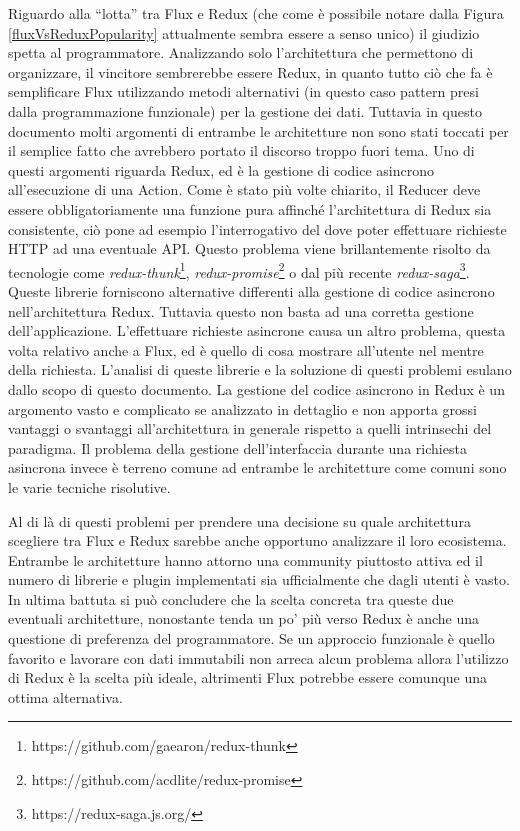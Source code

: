 Riguardo alla “lotta” tra Flux e Redux (che come è possibile notare dalla Figura \ref{fluxVsReduxPopularity} attualmente sembra essere a senso unico) il giudizio spetta al programmatore. Analizzando solo l'architettura che permettono di organizzare, il vincitore sembrerebbe essere Redux, in quanto tutto ciò che fa è semplificare Flux utilizzando metodi alternativi (in questo caso pattern presi dalla programmazione funzionale) per la gestione dei dati. Tuttavia in questo documento molti argomenti di entrambe le architetture non sono stati toccati per il semplice fatto che avrebbero portato il discorso troppo fuori tema.
Uno di questi argomenti riguarda Redux, ed è la gestione di codice asincrono all'esecuzione di una Action. Come è stato più volte chiarito, il Reducer deve essere obbligatoriamente una funzione pura affinché l'architettura di Redux sia consistente, ciò pone ad esempio l'interrogativo del dove poter effettuare richieste HTTP ad una eventuale API. Questo problema viene brillantemente risolto da tecnologie come \textit{redux-thunk}\footnote{https://github.com/gaearon/redux-thunk}, \textit{redux-promise}\footnote{https://github.com/acdlite/redux-promise} o dal più recente \textit{redux-saga}\footnote{https://redux-saga.js.org/}. Queste librerie forniscono alternative differenti alla gestione di codice asincrono nell'architettura Redux. Tuttavia questo non basta ad una corretta gestione dell'applicazione. L'effettuare richieste asincrone causa un altro problema, questa volta relativo anche a Flux, ed è quello di cosa mostrare all'utente nel mentre della richiesta. L'analisi di queste librerie e la soluzione di questi problemi esulano dallo scopo di questo documento. La gestione del codice asincrono in Redux è un argomento vasto e complicato se analizzato in dettaglio e non apporta grossi vantaggi o svantaggi all'architettura in generale rispetto a quelli intrinsechi del paradigma. Il problema della gestione dell'interfaccia durante una richiesta asincrona invece è terreno comune ad entrambe le architetture come comuni sono le varie tecniche risolutive.

Al di là di questi problemi per prendere una decisione su quale architettura scegliere tra Flux e Redux sarebbe anche opportuno analizzare il loro ecosistema. Entrambe le architetture hanno attorno una community piuttosto attiva ed il numero di librerie e plugin implementati sia ufficialmente che dagli utenti è vasto.
In ultima battuta si può concludere che la scelta concreta tra queste due eventuali architetture, nonostante tenda un po' più verso Redux è anche una questione di preferenza del programmatore. Se un approccio funzionale è quello favorito e lavorare con dati immutabili non arreca alcun problema allora l'utilizzo di Redux è la scelta più ideale, altrimenti Flux potrebbe essere comunque una ottima alternativa.
